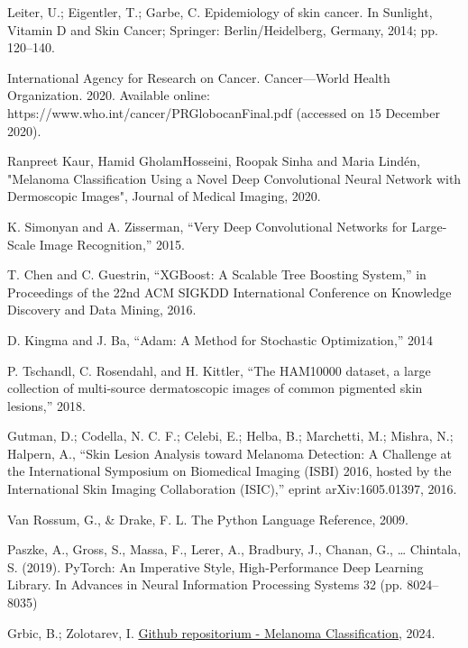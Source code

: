 \documentclass{article}
\begin{document}
\begin{enumerate}[label={[\arabic*]}]
  \item Leiter, U.; Eigentler, T.; Garbe, C. Epidemiology of skin cancer. In Sunlight, Vitamin D and Skin Cancer; Springer: Berlin/Heidelberg, Germany, 2014; pp. 120–140.
  \item International Agency for Research on Cancer. Cancer—World Health Organization. 2020. Available online: https://www.who.int/cancer/PRGlobocanFinal.pdf (accessed on 15 December 2020).
  \item Ranpreet Kaur, Hamid GholamHosseini, Roopak Sinha and Maria Lindén, "Melanoma Classification Using a Novel Deep Convolutional Neural Network with Dermoscopic Images", Journal of Medical Imaging, 2020.
  \item K. Simonyan and A. Zisserman, “Very Deep Convolutional Networks for Large-Scale Image Recognition,” 2015. %
  \item T. Chen and C. Guestrin, “XGBoost: A Scalable Tree Boosting System,” in Proceedings of the 22nd ACM SIGKDD International Conference on Knowledge Discovery and Data Mining, 2016. %
  \item D. Kingma and J. Ba, “Adam: A Method for Stochastic Optimization,” 2014 
  \item P. Tschandl, C. Rosendahl, and H. Kittler, “The HAM10000 dataset, a large collection of multi-source dermatoscopic images of common pigmented skin lesions,” 2018.
  \item Gutman, D.; Codella, N. C. F.; Celebi, E.; Helba, B.; Marchetti, M.; Mishra, N.; Halpern, A., “Skin Lesion Analysis toward Melanoma Detection: A Challenge at the International Symposium on Biomedical Imaging (ISBI) 2016, hosted by the International Skin Imaging Collaboration (ISIC),” eprint arXiv:1605.01397, 2016.
  \item Van Rossum, G., \& Drake, F. L. The Python Language Reference, 2009.
  \item Paszke, A., Gross, S., Massa, F., Lerer, A., Bradbury, J., Chanan, G., … Chintala, S. (2019). PyTorch: An Imperative Style, High-Performance Deep Learning Library. In Advances in Neural Information Processing Systems 32 (pp. 8024–8035)
  \item Grbic, B.; Zolotarev, I. \href{https://github.com/Brankonymous/MelanomaClassification}{Github repositorium - Melanoma Classification}, 2024. 
\end{enumerate}
\end{document}
